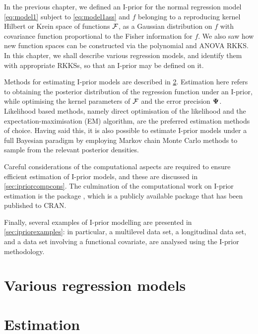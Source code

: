 \documentclass[a4paper,showframe,11pt]{report}
\begin{document}
\label{chapter4}

In the previous chapter, we defined an I-prior for the normal regression model \cref{eq:model1} subject to \cref{eq:model1ass} and $f$ belonging to a reproducing kernel Hilbert or Krein space of functions ${\mathcal F}$, as a Gaussian distribution on $f$ with covariance function proportional to the Fisher information for $f$.
We also saw how new function spaces can be constructed via the polynomial and ANOVA RKKS.
In this chapter, we shall describe various regression models, and identify them with appropriate RKKSs, so that an I-prior may be defined on it.

Methods for estimating I-prior models are described in \cref{sec:ipriorestimation}.
Estimation here refers to obtaining the posterior distribution of the regression function under an I-prior, while optimising the kernel parameters of ${\mathcal F}$ and the error precision ${\bm\Psi}$.
Likelihood based methods, namely direct optimisation of the likelihood and the expectation-maximisation (EM) algorithm, are the preferred estimation methods of choice.
Having said this, it is also possible to estimate I-prior models under a full Bayesian paradigm by employing Markov chain Monte Carlo methods to sample from the relevant posterior densities.

Careful considerations of the computational aspects are required to ensure efficient estimation of I-prior models, and these are discussed in \cref{sec:ipriorcompcons}.
The culmination of the computational work on I-prior estimation is the  package \citep{jamil2017}, which is a publicly available  package that has been published to CRAN.

Finally, several examples of I-prior modelling are presented in  \cref{sec:ipriorexamples}: in particular, a multilevel data set, a longitudinal data set, and a data set involving a functional covariate, are analysed using the I-prior methodology.

\section{Various regression models}\label{sec:various-regression}


\newpage
\section{Estimation}\label{sec:ipriorestimation}

\end{document}
